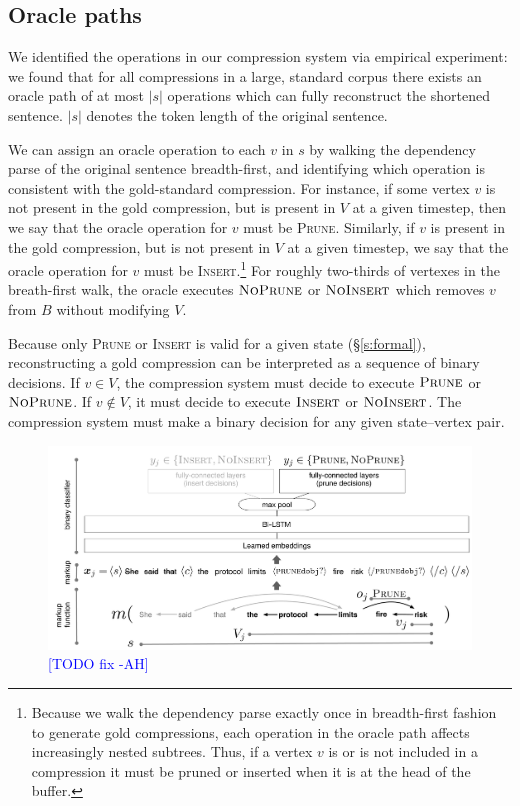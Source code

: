 \documentclass[11pt,a4paper]{article}
\newcommand{\ahcomment}[1]{\textcolor{blue}{[#1 -AH]}}
\begin{document}
\subsection{Oracle paths}\label{s:oracle}

We identified the operations in our compression system via empirical experiment: we found that for all compressions in a large, standard corpus \cite{filippova2013overcoming} there exists an oracle path of at most $|s|$ operations which can fully reconstruct the shortened sentence. $|s|$ denotes the token length of the original sentence.

We can assign an oracle operation to each $v$ in $s$ by walking the dependency parse of the original sentence breadth-first, and identifying which operation is consistent with the gold-standard compression. For instance, if some vertex $v$ is not present in the gold compression, but is present in ${V}$ at a given timestep, then we say that the oracle operation for $v$ must be \textsc{Prune}. Similarly, if $v$ is present in the gold compression, but is not present in ${V}$ at a given timestep, we say that the oracle operation for $v$ must be \textsc{Insert}.\footnote{Because we walk the dependency parse exactly once in breadth-first fashion to generate gold compressions, each operation in the oracle path affects increasingly nested subtrees. Thus, if a vertex $v$ is or is not included in a compression it must be pruned or inserted when it is at the head of the buffer.} For roughly two-thirds of vertexes in the breath-first walk, the oracle executes $\textsc{NoPrune}$ or $\textsc{NoInsert}$ which removes $v$ from $B$ without modifying $V$.

Because only \textsc{Prune} or \textsc{Insert} is valid for a given state (\S\ref{s:formal}), reconstructing a gold compression can be interpreted as a sequence of binary decisions. If $v \in V$, the compression system must decide to execute $\textsc{Prune}$ or $\textsc{NoPrune}$. If $v \notin V$, it must decide to execute $\textsc{Insert}$ or $\textsc{NoInsert}$. The compression system must make a binary decision for any given state--vertex pair.

\begin{figure}[htb!]
\centering
\includegraphics[width=.75\textwidth]{example.pdf}
\caption{\ahcomment{TODO fix} }
\label{f:example}
\end{figure}
\end{document}
